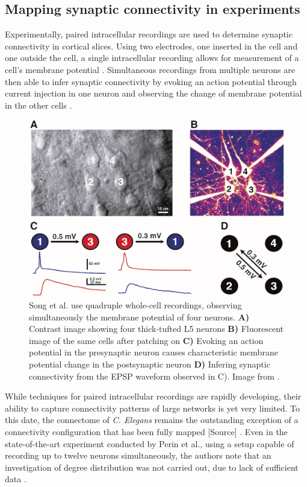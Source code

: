 \subsection*{Mapping synaptic connectivity in experiments}

Experimentally, paired intracellular recordings are used to determine
synaptic connectivity in cortical slices. Using two electrodes, one
inserted in the cell and one outside the cell, a single intracellular
recording allows for measurement of a cell's membrane potential
\parencite{Brette_Neural-activity}%
 \parencite{Scholarpedia-IntracellularRecording}. Simultaneous
recordings from multiple neurons are then able to infer synaptic
connectivity by evoking an action potential through current injection
in one neuron and observing the change of membrane potential in the
other cells \parencite{Song2005}.

\vspace{0.35cm}
\begin{figure}[bth]
  \centering
  \includegraphics[width=.75\linewidth]{gfx/img/song2005-quadruplet_recordings.png}
  \caption{Song et al. use quadruple whole-cell recordings, observing
    simultaneously the membrane potential of four neurons.
    \textbf{A)} Contrast image showing four thick-tufted L5 neurons
    \textbf{B)} Fluorescent image of the same cells after patching on
    \textbf{C)} Evoking an action potential in the presynaptic neuron
    causes characteristic membrane potential change in the
    postsynaptic neuron \textbf{D)} Infering synaptic connectivity
    from the EPSP waveform observed in C). Image from \parencite{Song2005}.
  }
\end{figure}
\vspace{0.45cm}

While techniques for paired intracellular recordings are rapidly
developing, their ability to capture connectivity patterns of large
networks is yet very limited. To this date, the connectome of
\textit{C. Elegans} remains the outstanding exception of a
connectivity configuration that has been fully mapped
[\textcolor{linkgrey}{Source}]%
. Even in the state-of-the-art experiment conducted by Perin et al.,
using a setup capable of recording up to twelve neurons
simultaneously, the authors note that an investigation of degree
distribution was not carried out, due to lack of sufficient data
\parencite{Perin2011}.

